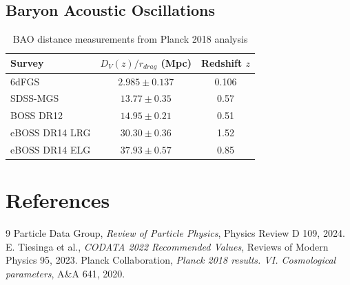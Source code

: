 \subsection{Baryon Acoustic Oscillations}

\begin{table}[h]
\centering
\begin{tabular}{lcc}
\hline
Survey & $D_V(z)/r_{drag}$ (Mpc) & Redshift $z$ \\
\hline
6dFGS & $2.985 \pm 0.137$ & 0.106 \\
SDSS-MGS & $13.77 \pm 0.35$ & 0.57 \\
BOSS DR12 & $14.95 \pm 0.21$ & 0.51 \\
eBOSS DR14 LRG & $30.30 \pm 0.36$ & 1.52 \\
eBOSS DR14 ELG & $37.93 \pm 0.57$ & 0.85 \\
\hline
\end{tabular}
\caption{BAO distance measurements from Planck 2018 analysis}
\end{table}

\section{References}

\begin{thebibliography}{9}
 Particle Data Group, \textit{Review of Particle Physics}, Physics Review D 109, 2024.
 E. Tiesinga et al., \textit{CODATA 2022 Recommended Values}, Reviews of Modern Physics 95, 2023.
 Planck Collaboration, \textit{Planck 2018 results. VI. Cosmological parameters}, A\&A 641, 2020.
\end{thebibliography}
